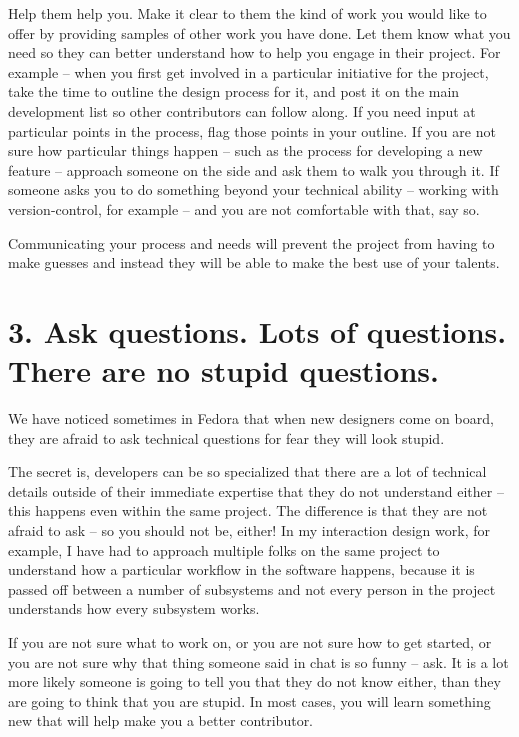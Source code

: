 Help them help you. Make it clear to them the kind of work you would like to offer by providing samples of other work you have done. Let them know what you need so they can better understand how to help you engage in their project. For example -- when you first get involved in a particular initiative for the project, take the time to outline the design process for it, and post it on the main development list so other contributors can follow along. If you need input at particular points in the process, flag those points in your outline. If you are not sure how particular things happen -- such as the process for developing a new feature -- approach someone on the side and ask them to walk you through it. If someone asks you to do something beyond your technical ability -- working with version-control, for example -- and you are not comfortable with that, say so.

Communicating your process and needs will prevent the project from having to
make guesses and instead they will be able to make the best use of your talents.

\section*{3. Ask questions. Lots of questions. There are no stupid questions.}

We have noticed sometimes in Fedora that when new designers come on board, they
are afraid to ask technical questions for fear they will look stupid. 

The secret is, developers can be so specialized that there are a lot of
technical details outside of their immediate expertise that they do not
understand either -- this happens even within the same project. The difference is that they are not afraid to ask -- so you should not be, either! In my interaction design work, for example, I have had to approach multiple folks on the same project to understand how a particular workflow in the software happens, because it is passed off between a number of subsystems and not every person in the project understands how every subsystem works. 

If you are not sure what to work on, or you are not sure how to get started, or
you are not sure why that thing someone said in chat is so funny -- ask. It is a
lot more likely someone is going to tell you that they do not know either, than
they are going to think that you are stupid. In most cases, you will learn
something new that will help make you a better contributor.

